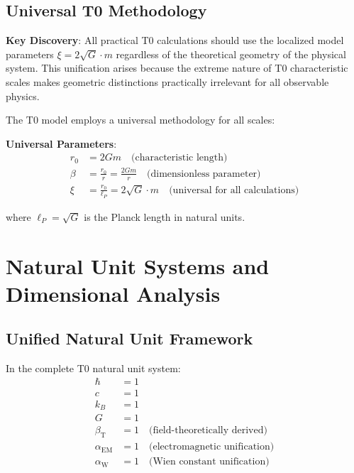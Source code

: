 \documentclass[12pt,a4paper]{article}
\newcommand{\betaT}{\beta_{\text{T}}}
\newcommand{\alphaEM}{\alpha_{\text{EM}}}
\newcommand{\alphaW}{\alpha_{\text{W}}}
\begin{document}
	\subsection{Universal T0 Methodology}
	\label{subsec:universal_methodology}
	
	\begin{tcolorbox}[colback=orange!5!white,colframe=orange!75!black,title=Universal T0 Calculation Method]
		\textbf{Key Discovery}: All practical T0 calculations should use the localized model parameters $\xi = 2\sqrt{G} \cdot m$ regardless of the theoretical geometry of the physical system. This unification arises because the extreme nature of T0 characteristic scales makes geometric distinctions practically irrelevant for all observable physics.
	\end{tcolorbox}
	
	The T0 model employs a universal methodology for all scales:
	
	\textbf{Universal Parameters}:
	\begin{align}
		r_0 &= 2Gm \quad \text{(characteristic length)} \\
		\beta &= \frac{r_0}{r} = \frac{2Gm}{r} \quad \text{(dimensionless parameter)} \\
		\xi &= \frac{r_0}{\ell_P} = 2\sqrt{G} \cdot m \quad \text{(universal for all calculations)}
	\end{align}
	
	where $\ell_P = \sqrt{G}$ is the Planck length in natural units.
	
	\section{Natural Unit Systems and Dimensional Analysis}
	\label{sec:natural_units}
	
	\subsection{Unified Natural Unit Framework}
	\label{subsec:unified_framework}
	
	In the complete T0 natural unit system:
	\begin{align}
		\hbar &= 1 \\
		c &= 1 \\
		k_B &= 1 \\
		G &= 1 \\
		\betaT &= 1 \quad \text{(field-theoretically derived)} \\
		\alphaEM &= 1 \quad \text{(electromagnetic unification)} \\
		\alphaW &= 1 \quad \text{(Wien constant unification)}
	\end{align}
	
\end{document}
